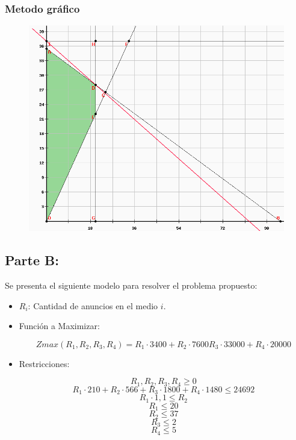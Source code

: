 \documentclass[]{article}
\begin{document}
\subsubsection{Metodo gráfico}

\begin{figure}[h] 
\centering
\includegraphics[scale=0.4]{grafico.png}
\end{figure}


\newpage
\subsection{Parte B:}

Se presenta el siguiente modelo para resolver el problema propuesto:

\begin{itemize}
    
\item $R_i$: Cantidad de anuncios en el medio $i$.

\item Función a Maximizar:

$$Zmax(R_1,R_2,R_3,R_4)=R_1\cdot 3400 + R_2\cdot 7600 R_3\cdot33000 + R_4\cdot 20000$$

\item Restricciones:

$$R_1 , R_2 , R_3 , R_4\geq 0$$
$$R_1\cdot 210 + R_2\cdot 566 + R_3\cdot 1800 + R_4\cdot 1480   \leq 24692$$
$$R_1\cdot1,1 \leq R_2$$
$$R_1 \leq 20$$
$$R_2 \leq 37$$
$$R_3 \leq 2$$
$$R_4 \leq 5$$



\end{itemize}
\end{document}
